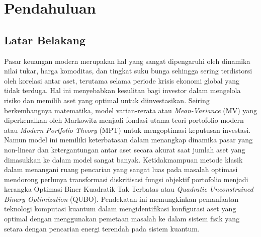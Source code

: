 \chapter{Pendahuluan}

\section{Latar Belakang}
Pasar keuangan modern merupakan hal yang sangat dipengaruhi oleh dinamika nilai tukar, harga komoditas, dan tingkat suku bunga sehingga sering terdistorsi oleh korelasi antar aset, terutama selama periode krisis ekonomi global yang tidak terduga. Hal ini menyebabkan kesulitan bagi investor dalam mengelola risiko dan memilih aset yang optimal untuk diinvestasikan. Seiring berkembangnya matematika, model varian-rerata atau \textit{Mean-Variance} (MV) yang diperkenalkan oleh Markowitz menjadi fondasi utama teori portofolio modern atau \textit{Modern Portfolio Theory} (MPT) untuk mengoptimasi keputusan investasi. Namun model ini memiliki keterbatasan dalam menangkap dinamika pasar yang non-linear dan ketergantungan antar aset secara akurat saat jumlah aset yang dimasukkan ke dalam model sangat banyak. Ketidakmampuan metode klasik dalam menangani ruang pencarian yang sangat luas pada masalah optimasi mendorong perlunya transformasi diskritisasi fungsi objektif portofolio menjadi kerangka Optimasi Biner Kuadratik Tak Terbatas atau \textit{Quadratic Unconstrained Binary Optimization} (QUBO). Pendekatan ini memungkinkan pemanfaatan teknologi komputasi kuantum dalam mengidentifikasi konfigurasi aset yang optimal dengan menggunakan pemetaan masalah ke dalam sistem fisik yang setara dengan pencarian energi terendah pada sistem kuantum.

